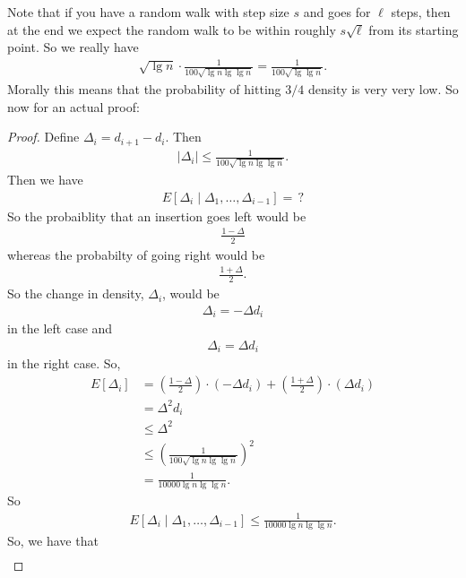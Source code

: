 \documentclass{report}
\begin{document}
Note that if you have a random walk with step size $s$ and goes for $\ell$ steps, then at the end we expect the random walk to be within roughly $s \sqrt{\ell}$ from its starting point. So we really have 
\begin{align*}
    \sqrt{\lg n} \cdot \frac{1}{100\sqrt{\lg n \lg \lg n}} = \frac{1}{100\sqrt{\lg \lg n}}.
\end{align*}
Morally this means that the probability of hitting $3/4$ density is very very low. So now for an actual proof:
\begin{proof}
    Define $\Delta_i = d_{i+1} - d_i$. Then 
    \begin{align*}
        |\Delta_i| \leq \frac{1}{100 \sqrt{\lg n \lg \lg n}}.
    \end{align*}
    Then we have 
    \begin{align*}
        E[\Delta_i \mid \Delta_1, \ldots, \Delta_{i-1}] =\, ?
    \end{align*}
    So the probaiblity that an insertion goes left would be 
    \begin{align*}
        \frac{1-\Delta}{2}
    \end{align*}
    whereas the probabilty of going right would be
    \begin{align*}
        \frac{1+\Delta}{2}.
    \end{align*}
    So the change in density, $\Delta_i$, would be 
    \begin{align*}
        \Delta_i = -\Delta d_i
    \end{align*}
    in the left case and 
    \begin{align*}
        \Delta_i = \Delta d_i
    \end{align*}
    in the right case. So,
    \begin{align*}
        E[\Delta_i] &= \left(\frac{1-\Delta}{2}\right) \cdot (-\Delta d_i) + \left(\frac{1+\Delta}{2}\right) \cdot (\Delta d_i) \\
        &= \Delta^2 d_i \\
        &\leq \Delta^2 \\
        &\leq \left(\frac{1}{100 \sqrt{\lg n \lg \lg n}}\right)^2 \\
        &= \frac{1}{10000\lg n \lg \lg n}.
    \end{align*}
    So 
    \begin{align*}
        E[\Delta_i \mid \Delta_1, \ldots, \Delta_{i-1}] \leq \frac{1}{10000\lg n \lg \lg n}.
    \end{align*}
    So, we have that 
    \begin{align*}

\end{align*}
\end{proof}
\end{document}

